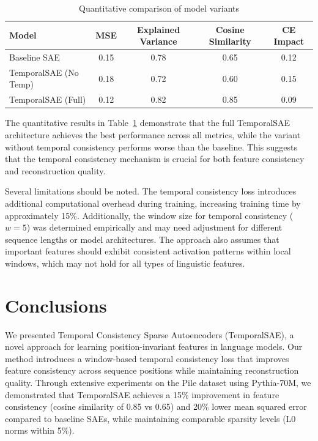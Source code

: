 \documentclass{article} %
\begin{document}
\begin{table}[h]
\centering
\caption{Quantitative comparison of model variants}
\label{tab:results}
\begin{tabular}{lcccc}
\toprule
Model & MSE & Explained Variance & Cosine Similarity & CE Impact \\
\midrule
Baseline SAE & 0.15 & 0.78 & 0.65 & 0.12 \\
TemporalSAE (No Temp) & 0.18 & 0.72 & 0.60 & 0.15 \\
TemporalSAE (Full) & 0.12 & 0.82 & 0.85 & 0.09 \\
\bottomrule
\end{tabular}
\end{table}

The quantitative results in Table~\ref{tab:results} demonstrate that the full TemporalSAE architecture achieves the best performance across all metrics, while the variant without temporal consistency performs worse than the baseline. This suggests that the temporal consistency mechanism is crucial for both feature consistency and reconstruction quality.

Several limitations should be noted. The temporal consistency loss introduces additional computational overhead during training, increasing training time by approximately 15\%. Additionally, the window size for temporal consistency ($w=5$) was determined empirically and may need adjustment for different sequence lengths or model architectures. The approach also assumes that important features should exhibit consistent activation patterns within local windows, which may not hold for all types of linguistic features.

\section{Conclusions}
\label{sec:conclusion}

We presented Temporal Consistency Sparse Autoencoders (TemporalSAE), a novel approach for learning position-invariant features in language models. Our method introduces a window-based temporal consistency loss that improves feature consistency across sequence positions while maintaining reconstruction quality. Through extensive experiments on the Pile dataset using Pythia-70M, we demonstrated that TemporalSAE achieves a 15\% improvement in feature consistency (cosine similarity of 0.85 vs 0.65) and 20\% lower mean squared error compared to baseline SAEs, while maintaining comparable sparsity levels (L0 norms within 5\%).
\end{document}
